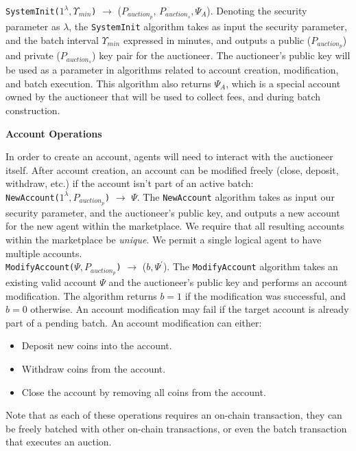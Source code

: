 \documentclass[10pt,a4paper]{article}
\theoremstyle{definition}
\begin{document}
\texttt{SystemInit($1^{\lambda}, \Upsilon_{min}$)} $\rightarrow$
($P_{auction_p}$, $P_{auction_s}, \Psi_{A}$). Denoting the security parameter
as $\lambda$, the \texttt{SystemInit} algorithm takes as input the security
parameter, and the batch interval $\Upsilon_{min}$ expressed in minutes, and
outputs a public ($P_{auction_p}$) and private ($P_{auction_s}$) key pair for
the auctioneer. The auctioneer's public key will be used as a parameter in
algorithms related to account creation, modification, and batch execution.
This algorithm also returns $\Psi_{A}$, which is a special account owned by the
auctioneer that will be used to collect fees, and during batch construction.

\begin{center}
    \textbf{Account Operations}
\end{center}

In order to create an account, agents will need to interact with the auctioneer
itself. After account creation, an account can be modified freely (close,
deposit, withdraw, etc.) if the account isn't part of an active batch: \\

\texttt{NewAccount($1^{\lambda}, P_{auction_p}$)} $\rightarrow$ $\Psi$. The
\texttt{NewAccount} algorithm takes as input our security parameter, and the
auctioneer's public key, and outputs a new account for the new agent within the
marketplace. We require that all resulting accounts within the marketplace be
\emph{unique}. We permit a single logical agent to have multiple accounts. \\

\texttt{ModifyAccount($\Psi, P_{auction_p}$)} $\rightarrow$ ($b, \Psi^\prime$).
The \texttt{ModifyAccount} algorithm takes an existing valid account $\Psi$ and
the auctioneer's public key and performs an account modification. The algorithm
returns $b=1$ if the modification was successful, and $b=0$ otherwise. An
account modification may fail if the target account is already part of a
pending batch. An account modification can either:
\begin{itemize}
    \item Deposit new coins into the account.
    \item Withdraw coins from the account.
    \item Close the account by removing all coins from the account.
\end{itemize}

Note that as each of these operations requires an on-chain transaction, they
can be freely batched with other on-chain transactions, or even the batch
transaction that executes an auction.
\end{document}
